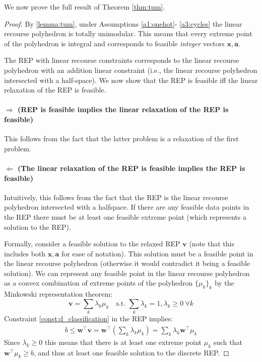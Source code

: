 We now prove the full result of Theorem \ref{thm:tum}. 
\begin{proof}
By \cref{lemma:tum}, under Assumptions \ref{a1:onehot}- \ref{a3:cycles} the linear recourse polyhedron is totally unimodular. This means that every extreme point of the polyhedron is integral and corresponds to feasible \emph{integer} vectors $\mathbf{x}, \mathbf{a}$. 

The REP with linear recourse constraints corresponds to the linear recourse polyhedron with an addition linear constraint (i.e., the linear recourse polyhedron intersected with a half-space). We now show that the REP is feasible iff the linear relaxation of the REP is feasible.

\paragraph{$\Rightarrow$ (REP is feasible implies the linear relaxation of the REP is feasible)}
This follows from the fact that the latter problem is a relaxation of the first problem.

\paragraph{$\Leftarrow$ (The linear relaxation of the REP is feasible implies the REP is feasible)}
Intuitively, this follows from the fact that the REP is the linear recourse polyhedron intersected with a halfspace. If there are any feasible data points in the REP there must be at least one feasible extreme point (which represents a solution to the REP).

Formally, consider a feasible solution to the relaxed REP $\mathbf{v}$ (note that this includes both $\mathbf{x}, \mathbf{a}$ for ease of notation). This solution must be a feasible point in the linear recourse polyhedron (otherwise it would contradict it being a feasible solution). We can represent any feasible point in the linear recourse polyhedron as a convex combination of extreme points of the polyhedron $\{\mu_k\}_k$ by the Minkowski representation theorem:
$$
\mathbf{v} = \sum_k \lambda_k \mu_k \quad\text{s.t. } \sum_k \lambda_k = 1, \lambda_k \geq 0 ~\forall k
$$
Constraint \eqref{const:d_classification} in the REP implies:
\begin{align*}
b \leq \mathbf{w}^\top \mathbf{v} 
= \mathbf{w}^\top (\sum_k \lambda_k \mu_k) 
= \sum_k \lambda_k \mathbf{w}^\top \mu_k
\end{align*}
Since $\lambda_k \geq 0$ this means that there is at least one extreme point $\mu_k$ such that $ \mathbf{w}^\top \mu_k \geq b$, and thus at least one feasible solution to the discrete REP.
\end{proof}